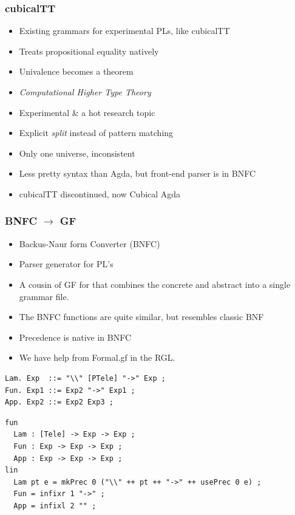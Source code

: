 \documentclass[9pt]{beamer}
\begin{document}
\begin{frame}
\frametitle{cubicalTT}
\begin{itemize}
\item Existing grammars for experimental PLs, like cubicalTT
\item Treats propositional equality natively
\item Univalence becomes a theorem
\item \emph{Computational Higher Type Theory}
\item Experimental \& a hot research topic
\item Explicit \emph{split} instead of pattern matching
\item Only one universe, inconsistent
\item Less pretty syntax than Agda, but front-end parser is in BNFC
\item cubicalTT discontinued, now Cubical Agda
\end{itemize}
\end{frame}

\begin{frame}[fragile]
\frametitle{BNFC $\to$ GF}

\begin{itemize}
\item Backus-Naur form Converter (BNFC) 
\item Parser generator for PL's
\item A cousin of GF for that combines the concrete and abstract into a single grammar file.
\item The BNFC functions are quite similar, but resembles classic BNF
\item Precedence is native in BNFC
\item We have help from Formal.gf in the RGL.
\end{itemize}

\begin{verbatim}
Lam. Exp  ::= "\\" [PTele] "->" Exp ;
Fun. Exp1 ::= Exp2 "->" Exp1 ;
App. Exp2 ::= Exp2 Exp3 ;
\end{verbatim}

\begin{verbatim}
fun
  Lam : [Tele] -> Exp -> Exp ;
  Fun : Exp -> Exp -> Exp ;
  App : Exp -> Exp -> Exp ;
lin
  Lam pt e = mkPrec 0 ("\\" ++ pt ++ "->" ++ usePrec 0 e) ;
  Fun = infixr 1 "->" ; 
  App = infixl 2 "" ;
\end{verbatim}
\end{frame}
\end{document}
